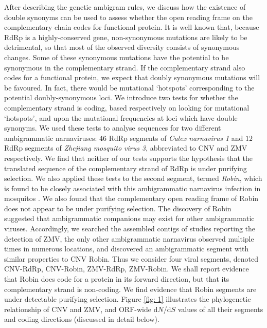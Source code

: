 \documentclass[unnumsec,webpdf,contemporary,large,namedate]{oup-authoring-template}%
\theoremstyle{thmstyleone}%
\theoremstyle{thmstyletwo}%
\theoremstyle{thmstylethree}%
\begin{document}
After describing the genetic ambigram rules, we discuss how the existence of double synonyms
can be used to assess whether the open reading frame on the complementary chain codes for
functional protein. It is well known that, because RdRp is a highly-conserved gene, 
non-synonymous mutations are likely to be detrimental, so that most of the observed 
diversity consists of synonymous changes. Some of these synonymous
mutations have the potential to be synonymous in the complementary strand. If the complementary
strand also codes for a functional protein, we expect that doubly synonymous mutations will be
favoured. In fact, there would be mutational \lq hotspots' corresponding to the potential
doubly-synonymous loci. We introduce two tests for whether the complementary strand
is coding, based respectively on looking for mutational \lq hotspots', and upon the mutational
frequencies at loci which have double synonyms. We used these tests to analyse sequences for
two different ambigrammatic narnaviruses: $46$ RdRp segments of \emph{Culex narnavirus 1} and
$12$ RdRp segments of \emph{Zhejiang mosquito virus 3}, abbreviated to CNV and ZMV respectively.
We find that neither of our tests supports the hypothesis
that the translated sequence of the complementary strand of RdRp
is under purifying selection. We also applied these tests to the second segment,
termed \emph{Robin}, which is found to be closely associated with this
ambigrammatic narnavirus infection in mosquitos \citep{Bat+20,Ret+20}. We also found that the
complementary open reading frame of Robin does not appear to be under purifying selection.
The discovery of Robin suggested that ambigrammatic companions may exist for
other ambigrammatic viruses. Accordingly, we searched the assembled contigs of studies reporting the detection of ZMV, the only other ambigrammatic narnavirus observed multiple times in numerous locations,
and discovered an ambigrammatic segment with similar properties to CNV Robin.
Thus we consider four viral segments, denoted CNV-RdRp, CNV-Robin, ZMV-RdRp, ZMV-Robin.
We shall report evidence that Robin does code for a protein in its forward direction, but that its
complementary strand is non-coding. We find evidence that Robin segments are under detectable
purifying selection. Figure \ref{fig: 1} illustrates the phylogenetic relationship of 
CNV and ZMV, and ORF-wide d$N$/d$S$ values of all their segments and coding directions 
(discussed in detail below).
\end{document}
